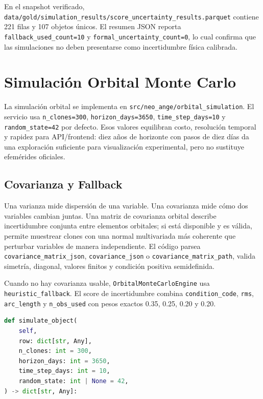 \documentclass[12pt,a4paper]{report}
\newcommand{\code}[1]{\texttt{#1}}
\DeclareRobustCommand{\filepath}[1]{\nolinkurl{#1}}
\begin{document}
En el snapshot verificado, \filepath{data/gold/simulation_results/score_uncertainty_results.parquet} contiene 221 filas y 107 objetos únicos. El resumen JSON reporta \code{fallback\_used\_count=10} y \code{formal\_uncertainty\_count=0}, lo cual confirma que las simulaciones no deben presentarse como incertidumbre física calibrada.

\chapter{Simulación Orbital Monte Carlo}

La simulación orbital se implementa en \filepath{src/neo_ange/orbital_simulation}. El servicio usa \code{n\_clones=300}, \code{horizon\_days=3650}, \code{time\_step\_days=10} y \code{random\_state=42} por defecto. Esos valores equilibran costo, resolución temporal y rapidez para API/frontend: diez años de horizonte con pasos de diez días da una exploración suficiente para visualización experimental, pero no sustituye efemérides oficiales.

\section{Covarianza y Fallback}

Una varianza mide dispersión de una variable. Una covarianza mide cómo dos variables cambian juntas. Una matriz de covarianza orbital describe incertidumbre conjunta entre elementos orbitales; si está disponible y es válida, permite muestrear clones con una normal multivariada más coherente que perturbar variables de manera independiente. El código parsea \code{covariance\_matrix\_json}, \code{covariance\_json} o \code{covariance\_matrix\_path}, valida simetría, diagonal, valores finitos y condición positiva semidefinida.

Cuando no hay covarianza usable, \code{OrbitalMonteCarloEngine} usa \code{heuristic\_fallback}. El score de incertidumbre combina \code{condition\_code}, \code{rms}, \code{arc\_length} y \code{n\_obs\_used} con pesos exactos 0.35, 0.25, 0.20 y 0.20.

\begin{lstlisting}[language=Python,caption={Fallback y parámetros orbitales}]
def simulate_object(
    self,
    row: dict[str, Any],
    n_clones: int = 300,
    horizon_days: int = 3650,
    time_step_days: int = 10,
    random_state: int | None = 42,
) -> dict[str, Any]:
\end{lstlisting}
\end{document}
